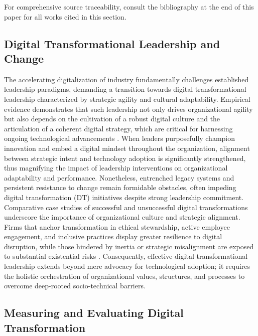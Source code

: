 \documentclass[sigconf]{acmart}
\begin{document}
For comprehensive source traceability, consult the bibliography at the end of this paper for all works cited in this section.

\subsection{Digital Transformational Leadership and Change}

The accelerating digitalization of industry fundamentally challenges established leadership paradigms, demanding a transition towards digital transformational leadership characterized by strategic agility and cultural adaptability. Empirical evidence demonstrates that such leadership not only drives organizational agility but also depends on the cultivation of a robust digital culture and the articulation of a coherent digital strategy, which are critical for harnessing ongoing technological advancements \cite{ref93}. When leaders purposefully champion innovation and embed a digital mindset throughout the organization, alignment between strategic intent and technology adoption is significantly strengthened, thus magnifying the impact of leadership interventions on organizational adaptability and performance. Nonetheless, entrenched legacy systems and persistent resistance to change remain formidable obstacles, often impeding digital transformation (DT) initiatives despite strong leadership commitment. Comparative case studies of successful and unsuccessful digital transformations underscore the importance of organizational culture and strategic alignment. Firms that anchor transformation in ethical stewardship, active employee engagement, and inclusive practices display greater resilience to digital disruption, while those hindered by inertia or strategic misalignment are exposed to substantial existential risks \cite{ref93}. Consequently, effective digital transformational leadership extends beyond mere advocacy for technological adoption; it requires the holistic orchestration of organizational values, structures, and processes to overcome deep-rooted socio-technical barriers.

\subsection{Measuring and Evaluating Digital Transformation}
\end{document}
